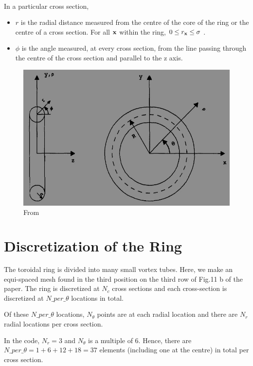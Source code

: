 \documentclass[10pt,a4paper]{report}
\newcommand{\xv}{{\bf x}}
\begin{document}
\paragraph{}
In a particular cross section,
\begin{itemize}
\item
$r$ is the radial distance measured from the centre of the core of the ring or the centre of a cross section. For all $\xv$ within the ring, $0 \leq r_\xv \leq \sigma $ . 
\item
$\phi$ is the angle measured, at every cross section, from the line passing through the centre of the cross section and parallel to the z axis.  
\end{itemize}
\begin{figure}
\includegraphics[scale=0.3]{axis.jpg}
\caption{From \cite{ghoniem}}
\end{figure}

\section{Discretization of the Ring}

The toroidal ring is divided into many small vortex tubes. Here, we make an equi-spaced mesh found in the third position on the third row of Fig.11 b of the paper\cite{ghoniem}. The ring is discretized at $N_c$ cross sections and each cross-section is discretized at $N\_per\_ \theta$ locations in total.

Of these $N\_per\_ \theta$ locations, $N_\theta $ points are at each radial location and there are $N_r $ radial locations per cross section. 

In the code, $N_r = 3$ and $N_\theta $ is a multiple of 6. Hence, there are $ N\_per\_\theta = 1 + 6 + 12 + 18 = 37$ elements (including one at the centre) in total per cross section. 
\end{document}
